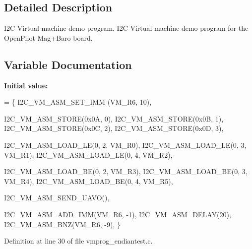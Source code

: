 \subsection{Detailed Description}
I2\-C Virtual machine demo program. I2\-C Virtual machine demo program for the Open\-Pilot Mag+\-Baro board.

\subsection{Variable Documentation}
\hypertarget{group___c_l_a_s_s_ga97db8eb6770f15d92457ae44bf607d31}{
\index{vmprog\-\_\-endiantest@{vmprog\-\_\-endiantest}!%
\subsubsection[{vmprog\-\_\-endiantest}]{\setlength{\rightskip}{0pt plus 5cm}{\bf const} {\bf uint32\-\_\-t} vmprog\-\_\-endiantest\mbox{[}$\,$\mbox{]}}}\label{group___c_l_a_s_s_ga97db8eb6770f15d92457ae44bf607d31}
{\bfseries Initial value\-:}
\begin{DoxyCode}
= \{
        I2C\_VM\_ASM\_SET\_IMM (VM\_R6, 10),

        I2C\_VM\_ASM\_STORE(0x0A, 0),
        I2C\_VM\_ASM\_STORE(0x0B, 1),
        I2C\_VM\_ASM\_STORE(0x0C, 2),
        I2C\_VM\_ASM\_STORE(0x0D, 3),

        
        I2C\_VM\_ASM\_LOAD\_LE(0, 2, VM\_R0),
        I2C\_VM\_ASM\_LOAD\_LE(0, 3, VM\_R1),
        I2C\_VM\_ASM\_LOAD\_LE(0, 4, VM\_R2),

        
        I2C\_VM\_ASM\_LOAD\_BE(0, 2, VM\_R3),
        I2C\_VM\_ASM\_LOAD\_BE(0, 3, VM\_R4),
        I2C\_VM\_ASM\_LOAD\_BE(0, 4, VM\_R5),

        I2C\_VM\_ASM\_SEND\_UAVO(), 

        I2C\_VM\_ASM\_ADD\_IMM(VM\_R6, -1),
        I2C\_VM\_ASM\_DELAY(20),
        I2C\_VM\_ASM\_BNZ(VM\_R6, -9),
\}
\end{DoxyCode}


Definition at line 30 of file vmprog\-\_\-endiantest.\-c.

\hypertarget{group___c_l_a_s_s_ga3158e6c7b2a8dff094103560829aba35}{
\index{vmprog\-\_\-endiantest\-\_\-len@{vmprog\-\_\-endiantest\-\_\-len}!%
\subsubsection[{vmprog\-\_\-endiantest\-\_\-len}]{\setlength{\rightskip}{0pt plus 5cm}{\bf const} {\bf uint32\-\_\-t} vmprog\-\_\-endiantest\-\_\-len = N\-E\-L\-E\-M\-E\-N\-T\-S({\bf vmprog\-\_\-endiantest})}}\label{group___c_l_a_s_s_ga3158e6c7b2a8dff094103560829aba35}


}}
